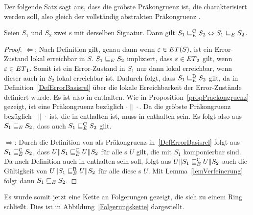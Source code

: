 Der folgende Satz sagt aus, dass \ERel{} die gröbste Präkongruenz ist, die
charakterisiert werden soll, also gleich der vollständig abstrakten
Präkongruenz \ECRel{}.

\begin{satz}
\label{satzFullAbstractness}
  Seien $S_1$ und $S_2$ zwei \EIO{}s mit derselben Signatur. Dann gilt
  $S_1\sqsubseteq _E^\mathrm{C} S_2\Leftrightarrow S_1\sqsubseteq _E S_2$.
\end{satz}

\begin{proof}
  \glqq{}$\Leftarrow$\grqq{}: Nach Definition gilt, genau dann wenn
      $\varepsilon\in ET{}(S)$, ist ein Error-Zustand lokal erreichbar in $S$.
      $S_1\sqsubseteq _E S_2$ impliziert, dass $\varepsilon\in
      ET{}_2$ gilt, wenn $\varepsilon\in ET{}_1$. Somit ist ein Error-Zustand
      in $S_1$ nur dann lokal erreichbar, wenn dieser auch in $S_2$ lokal
      erreichbar ist. Dadurch folgt, dass $S_1\sqsubseteq _E^\mathrm{B} S_2$ gilt, da \EBRel{} in
      Definition~\ref{DefErrorBasisrel} über die lokale Erreichbarkeit der
      Error-Zustände definiert wurde. Es ist also \ERel{} in \EBRel{} enthalten.
      Wie in Proposition~\ref{propPraekongruenz} gezeigt, ist \ERel{} eine
      Präkongruenz bezüglich $\cdot\|\cdot$. Da \ECRel{} die gröbste Präkongruenz bezüglich
      $\cdot\|\cdot$ ist, die in \EBRel{} enthalten ist, muss \ERel{} in
      \ECRel{} enthalten sein. Es folgt also aus $S_1\sqsubseteq _E S_2$, dass auch
      $S_1\sqsubseteq _E^\mathrm{C}{} S_2$ gilt.

      \glqq{}$\Rightarrow$\grqq{}: Durch die Definition von \ECRel{} als
      Präkongruenz in~\ref{DefErrorBasisrel} folgt aus $S_1\sqsubseteq _E^\mathrm{C} S_2$, dass
      $U\|S_1\sqsubseteq _E^\mathrm{C} U\|S_2$ für alle \EIO{}s $U$ gilt, die mit $S_1$ komponierbar
      sind. Da \ECRel{} nach Definition auch in \EBRel{} enthalten sein soll,
      folgt aus $U\|S_1\sqsubseteq _E^\mathrm{C} U\|S_2$ auch die Gültigkeit von $U\|S_1\sqsubseteq _E^\mathrm{B}
      U\|S_2$ für alle diese \EIO{}s $U$. Mit Lemma~\ref{lemVerfeinerung} folgt
      dann $S_1\sqsubseteq _E S_2$.
\end{proof}

Es wurde somit jetzt eine Kette an Folgerungen gezeigt, die sich zu einem
Ring schließt. Dies ist in Abbildung~\ref{Folgerungskette} dargestellt.

